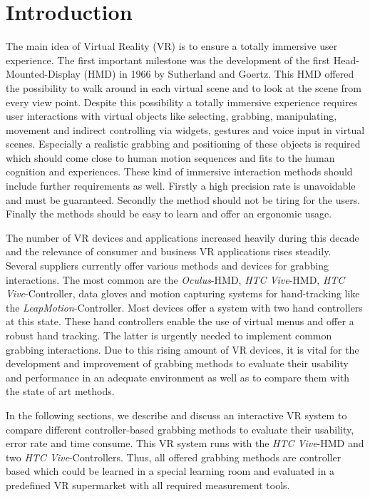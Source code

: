 \section{Introduction}\label{sec:Introduction}

The main idea of Virtual Reality (VR) is to ensure a totally immersive user experience. The first
important milestone was the development of the first Head-Mounted-Display (HMD) in 1966 by Sutherland and Goertz. This HMD offered the possibility to walk around in each virtual scene and to look at the scene from every view point. Despite this possibility a totally immersive experience requires user interactions with virtual objects like selecting, grabbing, manipulating, movement and indirect controlling via widgets, gestures and voice input in virtual scenes. Especially a realistic grabbing and positioning of these objects is required which should come close to human motion sequences and fits to the human cognition and experiences. These kind of immersive interaction methods should include further requirements as well. Firstly a high precision rate is unavoidable and must be guaranteed. Secondly the method should not be tiring for the users. Finally the methods should be easy to learn and offer an ergonomic usage. 

The number of VR devices and applications increased heavily during this decade and the relevance of consumer and business VR applications rises steadily. Several suppliers currently offer various methods and devices for grabbing interactions. The most common are the \textit{Oculus}-HMD, \textit{HTC Vive}-HMD, \textit{HTC Vive}-Controller, data gloves and motion capturing systems for hand-tracking like the \textit{LeapMotion}-Controller. Most devices offer a system with two hand controllers at this state. These hand controllers enable the use of virtual menus and offer a robust hand tracking. The latter is urgently needed to implement common grabbing interactions. Due to this rising amount of VR devices, it is vital for the development and improvement of grabbing methods to evaluate their usability and performance in an adequate environment as well as to compare them with the state of art methods. 

In the following sections, we describe and discuss an interactive VR system to compare different controller-based grabbing methods to evaluate their usability, error rate and time consume. This VR system runs with the \textit{HTC Vive}-HMD and two \textit{HTC Vive}-Controllers. Thus, all offered grabbing methods are controller based which could be learned in a special learning room and evaluated in a predefined VR supermarket with all required measurement tools.

